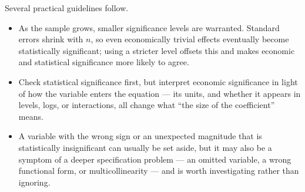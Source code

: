 Several practical guidelines follow.
\begin{itemize}
\item As the sample grows, smaller significance levels are warranted. Standard errors shrink with $n$, so even economically trivial effects eventually become statistically significant; using a stricter level offsets this and makes economic and statistical significance more likely to agree.
\item Check statistical significance first, but interpret economic significance in light of how the variable enters the equation --- its units, and whether it appears in levels, logs, or interactions, all change what ``the size of the coefficient'' means.
\item A variable with the wrong sign or an unexpected magnitude that is statistically insignificant can usually be set aside, but it may also be a symptom of a deeper specification problem --- an omitted variable, a wrong functional form, or multicollinearity --- and is worth investigating rather than ignoring.
\end{itemize}

